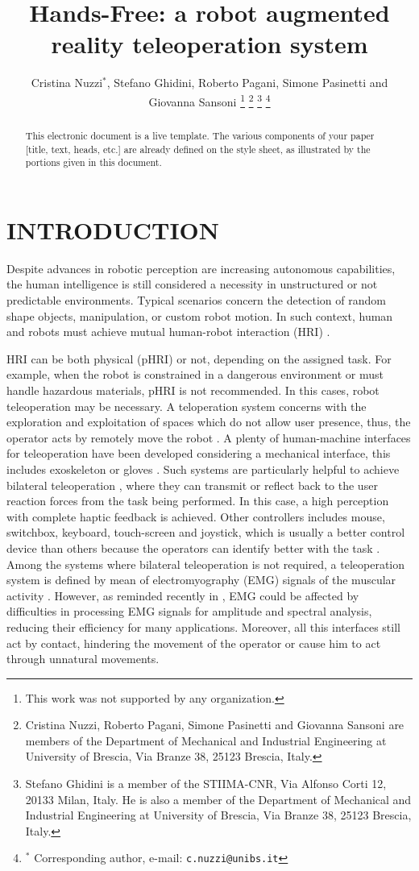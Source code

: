 \documentclass[letterpaper, 10 pt, conference]{ieeeconf}  %
\title{\LARGE \bf
Hands-Free: a robot augmented reality teleoperation system
}
\author{Cristina Nuzzi$^{*}$, Stefano Ghidini, Roberto Pagani, Simone Pasinetti and Giovanna Sansoni %
\thanks{This work was not supported by any organization.}%
\thanks{Cristina Nuzzi, Roberto Pagani, Simone Pasinetti and Giovanna Sansoni are members of the Department of Mechanical and Industrial Engineering at University of Brescia, Via Branze 38, 25123 Brescia, Italy.}
\thanks{Stefano Ghidini is a member of the STIIMA-CNR, Via Alfonso Corti 12, 20133 Milan, Italy. He is also a member of the Department of Mechanical and Industrial Engineering at University of Brescia, Via Branze 38, 25123 Brescia, Italy.}
\thanks{$^{*}$ Corresponding author, e-mail: {\tt\small c.nuzzi@unibs.it}}%
}
\begin{document}
\maketitle
\thispagestyle{empty}
\pagestyle{empty}

\begin{abstract}

This electronic document is a live template. The various components of your paper [title, text, heads, etc.] are already defined on the style sheet, as illustrated by the portions given in this document.

\end{abstract}


\section{INTRODUCTION}
Despite advances in robotic perception are increasing autonomous capabilities, the human intelligence is still considered a necessity in unstructured or not predictable environments. Typical scenarios concern the detection of random shape objects, manipulation, or custom robot motion. In such context, human and robots must achieve mutual human-robot interaction (HRI) \cite{Yanco2002}.

HRI can be both physical (pHRI) or not, depending on the assigned task. For example, when the robot is constrained in a dangerous environment or must handle hazardous materials, pHRI is not recommended. In this cases, robot teleoperation may be necessary. A teloperation system concerns with the exploration and exploitation of spaces which do not allow user presence, thus, the operator acts by remotely move the robot \cite{VERTUTJean}. A plenty of human-machine interfaces for teleoperation have been developed considering a mechanical interface, this includes exoskeleton \cite{Rebelo2014} or gloves \cite{Lv2006}. Such systems are particularly helpful to achieve bilateral teleoperation \cite{Hokayem2006}, where they can transmit or reflect back to the user reaction forces from the task being performed. In this case, a high perception with complete haptic feedback \cite{Glover2009} is achieved. Other controllers includes mouse, switchbox, keyboard, touch-screen and joystick, which is usually a better control device than others because the operators can identify better with the task \cite{Boboc2012}. Among the systems where bilateral teleoperation is not required, a teleoperation system is defined by mean of electromyography (EMG) signals of the muscular activity \cite{Vogel2011, Hassan2019}. However, as reminded recently in \cite{Roveda2018a}, EMG could be affected by difficulties in processing EMG signals for amplitude and spectral analysis, reducing their efficiency for many applications. Moreover, all this interfaces still act by contact, hindering the movement of the operator or cause him to act through unnatural movements.
\end{document}
